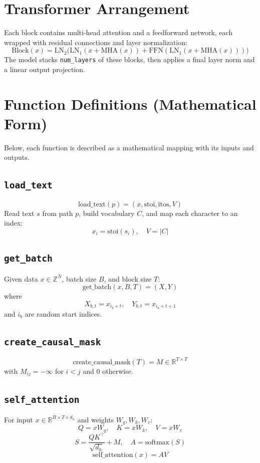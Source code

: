 \documentclass{article}
\begin{document}
\section*{Transformer Arrangement}
Each block contains multi-head attention and a feedforward network, each wrapped with residual connections and layer normalization:
\[
\text{Block}(x) = \text{LN}_2\big(\text{LN}_1(x + \text{MHA}(x)) + \text{FFN}(\text{LN}_1(x + \text{MHA}(x)))\big)
\]
The model stacks \texttt{num\_layers} of these blocks, then applies a final layer norm and a linear output projection.

\section*{Function Definitions (Mathematical Form)}
Below, each function is described as a mathematical mapping with its inputs and outputs.

\subsection*{\texttt{load\_text}}
\[
\mathrm{load\_text}(p) = (x, \mathrm{stoi}, \mathrm{itos}, V)
\]
Read text $s$ from path $p$, build vocabulary $C$, and map each character to an index:
\[
x_i = \mathrm{stoi}(s_i), \quad V = |C|
\]

\subsection*{\texttt{get\_batch}}
Given data $x \in \mathbb{Z}^N$, batch size $B$, and block size $T$:
\[
\mathrm{get\_batch}(x, B, T) = (X, Y)
\]
where
\[
X_{b,t} = x_{i_b + t}, \quad Y_{b,t} = x_{i_b + t + 1}
\]
and $i_b$ are random start indices.

\subsection*{\texttt{create\_causal\_mask}}
\[
\mathrm{create\_causal\_mask}(T) = M \in \mathbb{R}^{T \times T}
\]
with $M_{ij} = -\infty$ for $i < j$ and $0$ otherwise.

\subsection*{\texttt{self\_attention}}
For input $x \in \mathbb{R}^{B \times T \times d_h}$ and weights $W_q, W_k, W_v$:
\[
Q = x W_q, \quad K = x W_k, \quad V = x W_v
\]
\[
S = \frac{QK^\top}{\sqrt{d_h}} + M, \quad A = \mathrm{softmax}(S)
\]
\[
\mathrm{self\_attention}(x) = AV
\]
\end{document}
